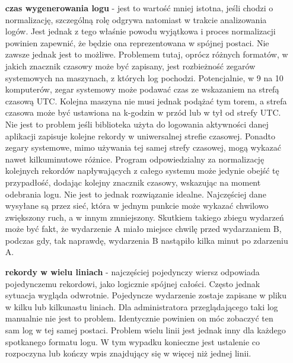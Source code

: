 \begin{itemize}
        \item[\textbf{czas wygenerowania logu}] - jest to wartość mniej istotna, jeśli chodzi o normalizację, szczególną rolę odgrywa natomiast
        w trakcie analizowania logów. Jest jednak z tego właśnie powodu wyjątkowa i proces normalizacji powinien zapewnić, że będzie ona reprezentowana w spójnej postaci.
        Nie zawsze jednak jest to możliwe. Problemem tutaj, oprócz
        różnych formatów, w jakich znacznik czasowy może być zapisany, jest rozbieżność zegarów systemowych na maszynach,
        z których log pochodzi. Potencjalnie, w 9 na 10 komputerów, zegar systemowy może podawać czas ze wskazaniem
        na strefą czasową UTC. Kolejna maszyna nie musi jednak podążać tym torem, a strefa czasowa może być ustawiona
        na k-godzin w przód lub w tył od strefy UTC. Nie jest to problem jeśli biblioteka użyta do logowania aktywności
        danej aplikacji zapisuje kolejne rekordy w uniwersalnej strefie czasowej. 
        Ponadto zegary systemowe, mimo używania tej samej strefy czasowej, mogą wykazać nawet kilkuminutowe różnice. 
        Program odpowiedzialny za normalizację kolejnych rekordów napływających z całego systemu może jedynie
        obejść tę przypadłość, dodając kolejny znacznik czasowy, wskazując na moment odebrania logu. 
        Nie jest to jednak rozwiązanie idealne. Najczęściej dane wysyłane są przez sieć, która w jednym punkcie może wykazać chwilowo
        zwiększony ruch, a w innym zmniejszony. Skutkiem takiego zbiegu wydarzeń może być fakt, że wydarzenie A miało miejsce
        chwilę przed wydarzaniem B, podczas gdy, tak naprawdę, wydarzenia B nastąpiło kilka minut po zdarzeniu A. 
        
        \item[\textbf{rekordy w wielu liniach}] - najczęściej pojedynczy wiersz odpowiada pojedynczemu rekordowi, jako logicznie
        spójnej całości. Często jednak sytuacja wygląda odwrotnie. Pojedyncze wydarzenie zostaje zapisane w pliku w kilku
        lub kilkunastu liniach. Dla administratora przeglądającego taki log manualnie nie jest to problem. Identycznie powinien on
        móc zobaczyć ten sam log w tej samej postaci. Problem wielu linii jest jednak inny dla każdego spotkanego formatu logu.
        W tym wypadku konieczne jest ustalenie co rozpoczyna lub kończy wpis znajdujący się w więcej niż jednej linii. 
        
    \end{itemize}
    
    